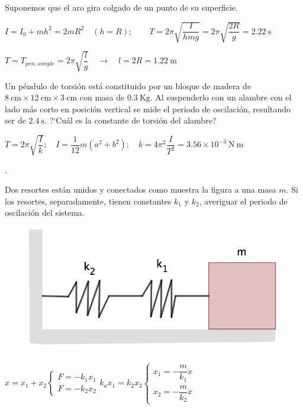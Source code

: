 Suponemos que el aro gira colgado de un punto de su superficie.

$I=I_0+mh^2=2mR^2\quad (h=R); \qquad  T=2\pi \sqrt{\dfrac{I}{hmg}}=2\pi \sqrt{\dfrac{2R}{g}}=2.22\ \mathrm{s}$

$T=T_{pen.\ simple}=2\pi \sqrt{\dfrac l g} \quad \to \quad l=2R=1.22\ \mathrm{m}$
\vspace{5mm}%
\begin{prob}
Un péndulo de torsión está constituido por un bloque de madera de $8\ \mathrm{cm}	\times 12 \ \mathrm{cm}	\times 3 \ \mathrm{cm}$ con masa de $0.3\ \mathrm{Kg}$. Al suspenderlo con un alambre con el lado más corto en posición vertical se mide el periodo de oscilación, resultando ser de $2.4\ \mathrm{s}$. ?`Cuál es la constante de torsión del alambre?
\end{prob}

$T=2\pi \sqrt{\dfrac I k};\quad I=\dfrac 1 {12} m (a^2+b^2); \quad k=4\pi^2 \dfrac {I}{T^2}=3.56\times 10^{-3} \ \mathrm{N \ m}$

\vspace{5mm}%
\begin{prob}
\begin{multicols}{2}.

Dos resortes están unidos y conectados como muestra la figura a una masa $m$. Si los resortes, separadamente, tienen constantes $k_1$ y $k_2$, averiguar el periodo de oscilación del sistema.
\begin{figure}[H]
		\centering
		\includegraphics[width=.4\textwidth]{imagenes/imagenes21/T21IM10.png}
	\end{figure}	
\end{multicols}	
\end{prob}

$x=x_1+x_2 \begin{cases}
 F=-k_1x_1 \\
 F=-k_2x_2	
 \end{cases}
 k_ax_1=k_2x_2 \begin{cases}
 x_1=-\dfrac{m}{k_1}\ddot{x} \\  x_2=-\dfrac{m}{k_2}\ddot{x}	
 \end{cases}$

